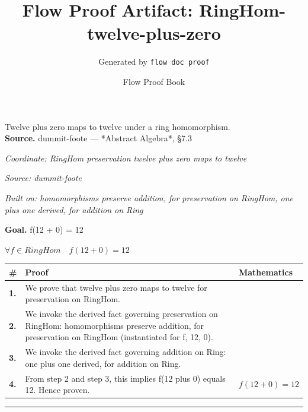\documentclass[11pt]{article}
\title{Flow Proof Artifact: RingHom-twelve-plus-zero}
\author{Generated by \texttt{flow doc proof}}
\date{Flow Proof Book}
\theoremstyle{definition}
\begin{document}
\maketitle
Twelve plus zero maps to twelve under a ring homomorphism.\\[0.5em]
\textbf{Source.} dummit-foote — *Abstract Algebra*, §7.3\\[0.5em]
\bigskip
{}\par
\smallskip\noindent\textit{Coordinate: RingHom \cdot preservation \cdot twelve plus zero maps to twelve}\par
\smallskip\noindent\textit{Source: dummit-foote}\par
\smallskip\noindent\textit{Built on: homomorphisms preserve addition, for preservation on RingHom, one plus one derived, for addition on Ring}\par
\medskip
\noindent\textbf{Goal.} f(12 + 0) = 12\par
\noindent$\displaystyle \forall f \in RingHom\quad f(12 + 0) = 12$\par
\medskip
\noindent
\begin{tabular}{@{} >{\raggedright\arraybackslash}p{} >{\raggedright\arraybackslash}p{} >{\raggedleft\arraybackslash}p{} @{}}
\textbf{\#} & \textbf{Proof} & \textbf{Mathematics} \\
\midrule
\textbf{1.} & We prove that twelve plus zero maps to twelve for preservation on RingHom. & \\[0.45em]
\textbf{2.} & We invoke the derived fact governing preservation on RingHom: homomorphisms preserve addition, for preservation on RingHom (instantiated for f, 12, 0). & \\[0.45em]
\textbf{3.} & We invoke the derived fact governing addition on Ring: one plus one derived, for addition on Ring. & \\[0.45em]
\textbf{4.} & From step 2 and step 3, this implies f(12 plus 0) equals 12. Hence proven. & $\displaystyle f(12 + 0) = 12$ \\[0.45em]
\bottomrule
\end{tabular}
\label{thm:RingHom-preservation-twelve_plus_zero_maps_to_twelve}
\par\medskip\hrule
\end{document}
